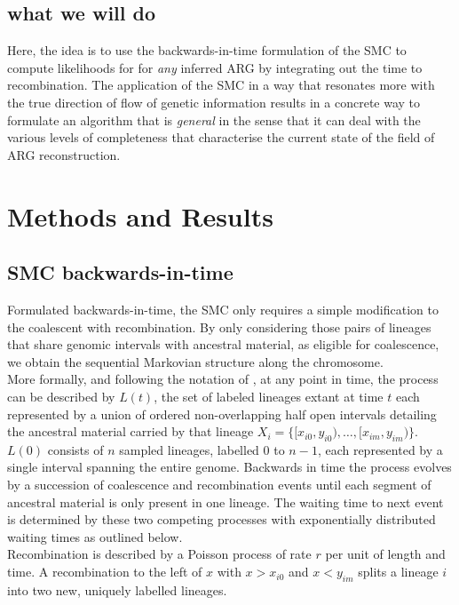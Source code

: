 \documentclass{article}
\begin{document}
\subsection{what we will do}

Here, the idea is to use the backwards-in-time formulation of the SMC to 
compute likelihoods for for \textit{any} inferred ARG 
by integrating out the time to recombination.
The application of the SMC in a way that resonates more 
with the true direction of flow of genetic information 
results in a concrete way to formulate an algorithm 
that is \textit{general} in the sense that it can deal with the various levels of 
completeness that characterise the current state of the field of ARG reconstruction.


\section{Methods and Results}
\subsection{SMC backwards-in-time}\label{par:description}

Formulated backwards-in-time, the SMC \citep{mcvean_approximating_2005} only requires a 
simple modification to the 
coalescent with recombination. By only considering those pairs of 
lineages that share 
genomic intervals with ancestral material, as eligible for coalescence, we obtain the 
sequential Markovian structure along the chromosome.\\

More formally, and following the notation of \citet{mcvean_approximating_2005}, at any 
point in time, the process can be described by $L(t)$, the set of labeled lineages 
extant at time $t$ each represented by a union of ordered non-overlapping half open 
intervals detailing the ancestral material 
carried by that lineage $X_i = \{[x_{i0}, y_{i0}), \dotsc, [x_{im}, y_{im})\}$.
$L(0)$ consists of $n$ sampled lineages, labelled $0$ to $n-1$, each represented by a 
single interval spanning the entire genome.
Backwards in time the process evolves by a succession of coalescence and recombination 
events until each segment of ancestral material is only present in one lineage. 
The waiting time to next event is determined by these two competing processes 
with exponentially distributed waiting times as outlined below.\\

Recombination is described by a Poisson process of rate $r$ per unit of length and time. 
A recombination to the 
left of $x$ with $x>x_{i0}$ and $x<y_{im}$ splits a lineage $i$ into two new, uniquely 
labelled lineages. \\ %
\end{document}
